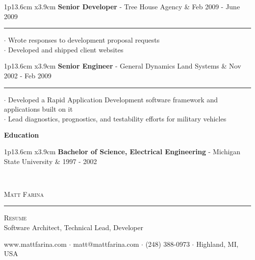\documentclass[10pt,A4]{article}
\newcommand{\cvsection}[1]
{
	\begin{center}
		\large\textcolor{sectcol}{\textbf{#1}}
	\end{center}
}
\newcommand{\cvevent}[5]
{

\begin{tabular*}{1\textwidth}{p{13.6cm}  x{3.9cm}}
	\textbf{#2} - \textcolor{bgcol}{#3} &   \vspace{2.5pt}\textcolor{sectcol}{#1}
\end{tabular*}

\vspace{-8pt}
\textcolor{softcol}{\hrule}
\vspace{6pt}

  $\cdot$ #4\\[3pt]
  $\cdot$ #5\\[6pt]

}
\newcommand{\cveventzero}[3]
{

\begin{tabular*}{1\textwidth}{p{13.6cm}  x{3.9cm}}
	\textbf{#2} - \textcolor{bgcol}{#3} &   \vspace{2.5pt}\textcolor{sectcol}{#1}
\end{tabular*}

\vspace{-8pt}
\vspace{6pt}

}
\newcommand{\mystrut}{\rule[-.3\baselineskip]{0pt}{\baselineskip}}
\begin{document}

%
\cvevent{Feb 2009 - June 2009}{Senior Developer}{Tree House Agency}{Wrote responses to development proposal requests}{Developed and shipped client websites}



%
\cvevent{Nov 2002 - Feb 2009}{Senior Engineer}{General Dynamics Land Systems}{Developed a Rapid Application Development software framework and applications built on it}{Lead diagnostics, prognostics, and testability efforts for military vehicles}

\cvsection{Education}

%
\cveventzero{1997 - 2002}{Bachelor of Science, Electrical Engineering}{Michigan State University}



\null
\vspace*{\fill}
\hspace{-0.25\linewidth}\colorbox{bgcol}{\makebox[1.5\linewidth][c]{\mystrut \small \textcolor{white}{www.mattfarina.com} $\cdot$ \textcolor{white}{github.com/mattfarina} $\cdot$ \textcolor{white}{linkedin.com/in/matthewfarina}}}
\\[-6pt]
\newpage

\vspace{-8pt}
\begin{center}
	\HUGE \textsc{Matt Farina} \textcolor{sectcol}{\rule[-1mm]{1mm}{0.9cm}} \textsc{Resume}\\[2pt]
	\small Software Architect, Technical Lead, Developer
\end{center}

\begin{center}
	\small \textcolor{bgcol}{www.mattfarina.com $\cdot$ matt@mattfarina.com $\cdot$ (248) 388-0973 $\cdot$ Highland, MI, USA}
\end{center}
\end{document}

